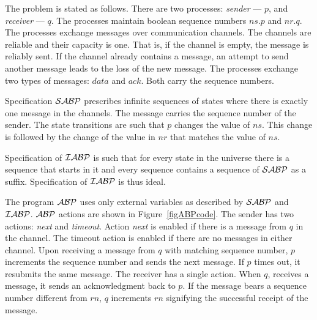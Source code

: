 \documentclass[11pt]{llncs}
\def\PROG#1{${\cal #1}$}
\begin{document}
The problem is stated as follows. There are two processes:
\emph{sender} --- $p$, and \emph{receiver} --- $q$. The processes
maintain boolean sequence numbers $ns.p$ and $nr.q$. The processes
exchange messages over communication channels. The channels are
reliable and their capacity is one. That is, if the channel is empty,
the message is reliably sent. If the channel already contains a
message, an attempt to send another message leads to the loss of the
new message.  The processes exchange two types of messages: $data$ and
$ack$. Both carry the sequence numbers.

Specification \PROG{SABP} prescribes infinite sequences of states
where there is exactly one message in the channels. The message
carries the sequence number of the sender. The state transitions are
such that $p$ changes the value of $ns$. This change is followed by
the change of the value in $nr$ that matches the value of $ns$.

Specification of \PROG{IABP} is such that for every state in the
universe there is a sequence that starts in it and every sequence
contains a sequence of \PROG{SABP} as a suffix.  Specification of
\PROG{IABP} is thus ideal.

The program \PROG{ABP} uses only external variables as described by
\PROG{SABP} and \PROG{IABP}. \PROG{ABP} actions are shown in
Figure~\ref{figABPcode}. The sender has two actions: \emph{next} and
\emph{timeout}. Action \emph{next} is enabled if there is a message
from $q$ in the channel. The timeout action is enabled if there are no
messages in either channel.  Upon receiving a message from $q$ with
matching sequence number, $p$ increments the sequence number and sends
the next message. If $p$ times out, it resubmits the same message.
The receiver has a single action. When $q$, receives a message, it
sends an acknowledgment back to $p$. If the message bears a sequence
number different from $rn$, $q$ increments $rn$ signifying the
successful receipt of the message.
\end{document}
